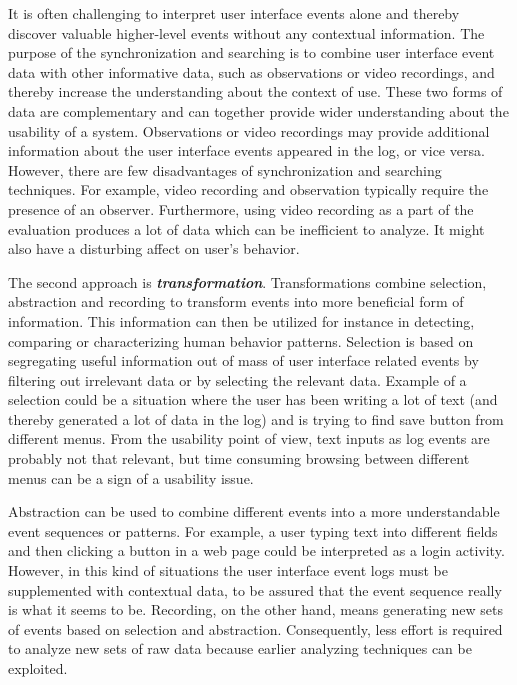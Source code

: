 \documentclass[12pt,a4paper,oneside,pdftex]{report}
\begin{document}
It is often challenging to interpret user interface events alone and thereby discover valuable higher-level events without any contextual information. The purpose of the synchronization and searching is to combine user interface event data with other informative data, such as observations or video recordings, and thereby increase the understanding about the context of use. These two forms of data are complementary and can together provide wider understanding about the usability of a system. Observations or video recordings may provide additional information about the user interface events appeared in the log, or vice versa. However, there are few disadvantages of synchronization and searching techniques. For example, video recording and observation typically require the presence of an observer. Furthermore, using video recording as a part of the evaluation produces a lot of data which can be inefficient to analyze. It might also have a disturbing affect on user's behavior. \citep{RefWorks:25}

The second approach is \textbf{\emph{transformation}}. Transformations combine selection, abstraction and recording to transform events into more beneficial form of information. This information can then be utilized for instance in detecting, comparing or characterizing human behavior patterns. Selection is based on segregating useful information out of mass of user interface related events by filtering out irrelevant data or by selecting the relevant data. Example of a selection could be a situation where the user has been writing a lot of text (and thereby generated a lot of data in the log) and is trying to find save button from different menus. From the usability point of view, text inputs as log events are probably not that relevant, but time consuming browsing between different menus can be a sign of a usability issue. \citep{RefWorks:25}

Abstraction can be used to combine different events into a more understandable event sequences or patterns. For example, a user typing text into different fields and then clicking a button in a web page could be interpreted as a login activity. However, in this kind of situations the user interface event logs must be supplemented with contextual data, to be assured that the event sequence really is what it seems to be. Recording, on the other hand, means generating new sets of events based on selection and abstraction. Consequently, less effort is required to analyze new sets of raw data because earlier analyzing techniques can be exploited. \citep{RefWorks:25}
\end{document}
